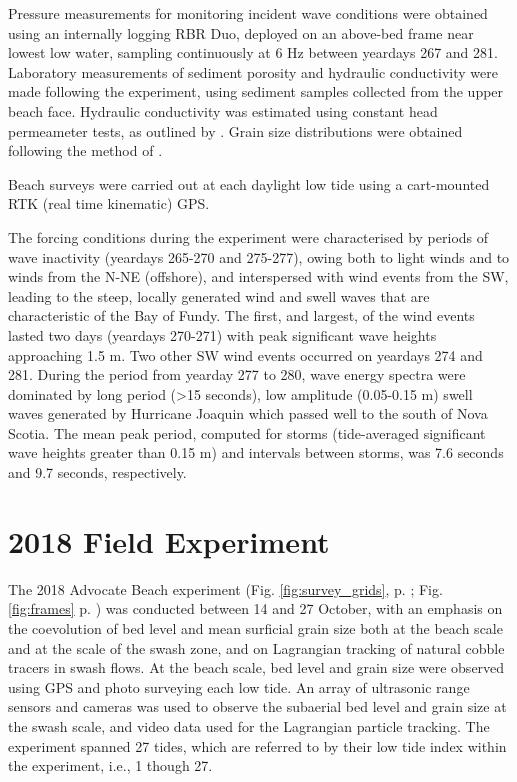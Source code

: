 Pressure measurements for monitoring incident wave conditions were obtained using an internally logging RBR Duo, deployed on an above-bed frame near lowest low water, sampling continuously at 6 Hz between yeardays 267 and 281. Laboratory measurements of sediment porosity and hydraulic conductivity were made following the experiment, using sediment samples collected from the upper beach face. Hydraulic conductivity was estimated using constant head permeameter tests, as outlined by \citet{Craig1974}. Grain size distributions were obtained following the method of \citet{Ingram1971}. 

Beach surveys were carried out at each daylight low tide using a cart-mounted RTK (real time kinematic) GPS.

The forcing conditions during the experiment were characterised by periods of wave inactivity (yeardays 265-270 and 275-277), owing both to light winds and to winds from the N-NE (offshore), and interspersed with wind events from the SW, leading to the steep, locally generated wind and swell waves that are characteristic of the Bay of Fundy. The first, and largest, of the wind events lasted two days (yeardays 270-271) with peak significant wave heights approaching 1.5 m. Two other SW wind events occurred on yeardays 274 and 281. During the period from yearday 277 to 280, wave energy spectra were dominated by long period (\textgreater 15 seconds), low amplitude (0.05-0.15 m) swell waves generated by Hurricane Joaquin which passed well to the south of Nova Scotia. The mean peak period, computed for storms (tide-averaged significant wave heights greater than 0.15 m) and intervals between storms, was 7.6 seconds and 9.7 seconds, respectively.




\section{2018 Field Experiment}\label{Intro:Adv2018}

The 2018 Advocate Beach experiment (Fig. \ref{fig:survey_grids}, p. \pageref{fig:survey_grids}; Fig. \ref{fig:frames} p. \pageref{fig:frames}) was conducted between 14 and 27 October, with an emphasis on the coevolution of bed level and mean surficial grain size both at the beach scale and at the scale of the swash zone, and on Lagrangian tracking of natural cobble tracers in swash flows. At the beach scale, bed level and grain size were observed using GPS and photo surveying each low tide. An array of ultrasonic range sensors and cameras was used to observe the subaerial bed level and grain size at the swash scale, and video data used for the Lagrangian particle tracking. The experiment spanned 27 tides, which are referred to by their low tide index within the experiment, i.e., 1 though 27.


